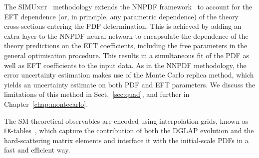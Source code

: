 \documentclass[withindex,glossary]{cam-thesis}
\newcommand{\simunet}{\textsc{SIMUnet}}
\newcommand{\JM}[1]{{\bf\color{cyan}JM: #1}}
\begin{document}
The  \simunet{}~\cite{Iranipour:2022iak}
methodology extends the  NNPDF framework~\cite{NNPDF:2021njg, NNPDF:2021uiq} to
account for the EFT dependence (or, in principle, any parametric dependence) 
of the theory cross-sections entering the
PDF determination.
%
This is achieved by adding an extra layer to the NNPDF neural network to
encapsulate the dependence of the theory predictions on the EFT coefficients,
including the free parameters in the general optimisation procedure. This
results in a simultaneous fit of the PDF as well as EFT coefficients to the
input data.
%
As in the NNPDF methodology, the error uncertainty estimation makes use of the Monte
Carlo replica method, which yields an uncertainty estimate on both PDF and EFT
parameters.  We discuss the limitations of this method in Sect.~\ref{sec:quad}, and further
in Chapter~\ref{chap:montecarlo}.

The SM theoretical observables are encoded using interpolation grids,
known as {\tt FK}-tables~\cite{Ball:2010de,Ball:2012cx,Bertone:2016lga}, which 
capture the contribution of both the DGLAP evolution
and the hard-scattering matrix elements and interface it with the
initial-scale PDFs in a fast and efficient way. 
%
\end{document}
